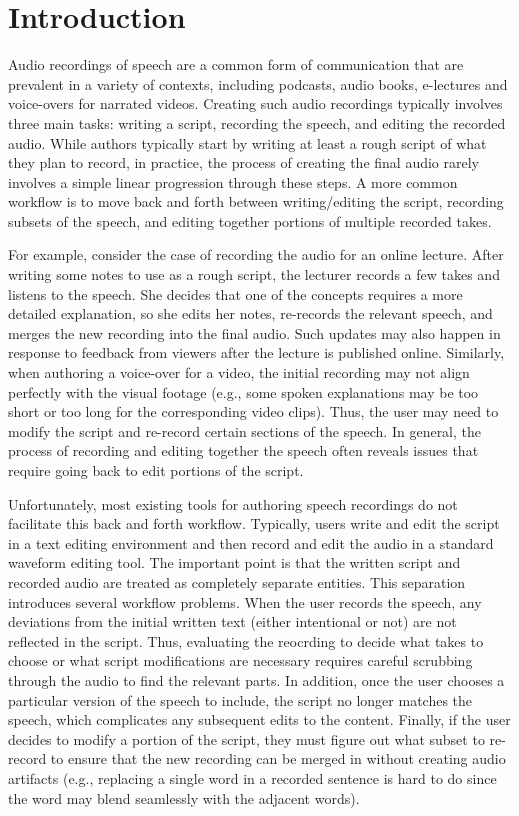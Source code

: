\section{Introduction}

Audio recordings of speech are a common form of communication that are prevalent in a variety of contexts, including podcasts, audio books, e-lectures and voice-overs for narrated videos.
%
Creating such audio recordings typically involves three main tasks: writing a script, recording the speech, and editing the recorded audio. 
%
While authors typically start by writing at least a rough script of what they plan to record, in practice, the process of creating the final audio rarely involves a simple linear progression through these steps. A more common workflow is to move back and forth between writing/editing the script, recording subsets of the speech, and editing together portions of multiple recorded takes.

For example, consider the case of recording the audio for an online lecture. After writing some notes to use as a rough script, the lecturer records a few takes and listens to the speech. She decides that one of the concepts requires a more detailed explanation, so she edits her notes, re-records the relevant speech, and merges the new recording into the final audio. Such updates may also happen in response to feedback from viewers after the lecture is published online. Similarly, when authoring a voice-over for a video, the initial recording may not align perfectly with the visual footage (e.g., some spoken explanations may be too short or too long for the corresponding video clips). Thus, the user may need to modify the script and re-record certain sections of the speech. In general, the process of recording and editing together the speech often reveals issues that require going back to edit portions of the script.

Unfortunately, most existing tools for authoring speech recordings do not facilitate this back and forth workflow. Typically, users write and edit the script in a text editing environment and then record and edit the audio in a standard waveform editing tool. The important point is that the written script and recorded audio are treated as completely separate entities.
%
This separation introduces several workflow problems. When the user records the speech, any deviations from the initial written text (either intentional or not) are not reflected in the script. Thus, evaluating the reocrding to decide what takes to choose or what script modifications are necessary requires careful scrubbing through the audio to find the relevant parts. In addition, once the user chooses a particular version of the speech to include, the script no longer matches the speech, which complicates any subsequent edits to the content. Finally, if the user decides to modify a portion of the script, they must figure out what subset to re-record to ensure that the new recording can be merged in without creating audio artifacts (e.g., replacing a single word in a recorded sentence is hard to do since the word may blend seamlessly with the adjacent words).

